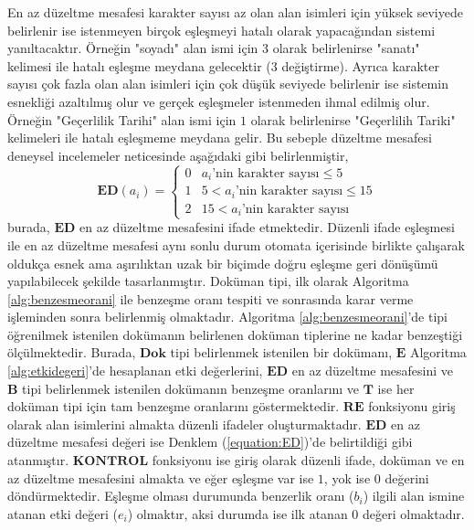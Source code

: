 \documentclass[conference, a4paper]{IEEEtran}
\begin{document}
En az düzeltme mesafesi karakter sayısı az olan alan isimleri için yüksek seviyede belirlenir ise istenmeyen birçok
eşleşmeyi hatalı olarak yapacağından sistemi yanıltacaktır. Örneğin "soyadı" alan ismi için $3$ olarak belirlenirse
"sanatı" kelimesi ile hatalı eşleşme meydana gelecektir ($3$ değiştirme). Ayrıca karakter sayısı çok fazla olan alan
isimleri için çok düşük seviyede belirlenir ise sistemin esnekliği azaltılmış olur ve  gerçek eşleşmeler istenmeden
ihmal edilmiş olur. Örneğin "Geçerlilik Tarihi" alan ismi için $1$ olarak belirlenirse "Geçerlilih Tariki" kelimeleri
ile hatalı eşleşmeme meydana gelir. Bu sebeple düzeltme mesafesi deneysel incelemeler neticesinde aşağıdaki gibi
belirlenmiştir,
\begin{equation}
    \label{equation:ED}
    \mathbf{ED}(a_i) = \begin{cases}
        0 & \text{$a_i$'nin karakter sayısı} \leq 5      \\
        1 & 5 < \text{$a_i$'nin karakter sayısı} \leq 15 \\
        2 & 15 < \text{$a_i$'nin karakter sayısı}
    \end{cases}
\end{equation}
\noindent burada, $\mathbf{ED}$ en az düzeltme mesafesini ifade etmektedir. Düzenli ifade eşleşmesi ile en az düzeltme
mesafesi aynı sonlu durum otomata içerisinde birlikte çalışarak oldukça esnek ama aşırılıktan uzak bir biçimde doğru
eşleşme geri dönüşümü yapılabilecek şekilde tasarlanmıştır. Doküman tipi, ilk olarak Algoritma \ref{alg:benzesmeorani}
ile benzeşme oranı tespiti ve sonrasında karar verme işleminden sonra belirlenmiş olmaktadır. Algoritma
\ref{alg:benzesmeorani}'de tipi öğrenilmek istenilen dokümanın belirlenen doküman tiplerine ne kadar benzeştiği
ölçülmektedir. Burada, $\mathbf{Dok}$ tipi belirlenmek istenilen bir dokümanı, $\mathbf{E}$ Algoritma
\ref{alg:etkidegeri}'de hesaplanan etki değerlerini, $\mathbf{ED}$ en az düzeltme mesafesini ve $\mathbf{B}$ tipi
belirlenmek istenilen dokümanın benzeşme oranlarını ve $\mathbf{T}$ ise her doküman tipi için tam benzeşme oranlarını
göstermektedir. $\mathbf{RE}$ fonksiyonu giriş olarak alan isimlerini almakta düzenli ifadeler oluşturmaktadır.
$\mathbf{ED}$ en az düzeltme mesafesi değeri ise Denklem (\ref{equation:ED})'de belirtildiği gibi atanmıştır.
$\mathbf{KONTROL}$ fonksiyonu ise giriş olarak düzenli ifade, doküman ve en az düzeltme mesafesini almakta ve eğer
eşleşme var ise $1$, yok ise $0$ değerini döndürmektedir. Eşleşme olması durumunda benzerlik oranı ($b_i$) ilgili alan
ismine atanan etki değeri ($e_i$) olmaktır, aksi durumda ise ilk atanan $0$ değeri olmaktadır.
\end{document}
